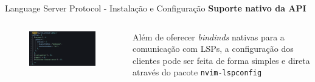 \begin{frame}{Language Server Protocol - Instalação e Configuração}
  \textbf{Suporte nativo da API}
    \begin{columns}
      \begin{column}{0.4\textwidth}
        \begin{figure}
            \centering
            \includegraphics[height=0.6\linewidth]{Image/nvim-lspconfig.png}
            \label{nvim-lspconfig}
        \end{figure}
      \end{column}

      \begin{column}{0.6\textwidth}
        \begin{widedescription}
          \item Além de oferecer \textit{bindinds} nativas para a comunicação com LSPs, a configuração dos clientes pode
            ser feita de forma simples e direta através do pacote \texttt{nvim-lspconfig}
        \end{widedescription}
      \end{column}
  \end{columns}
\end{frame}

